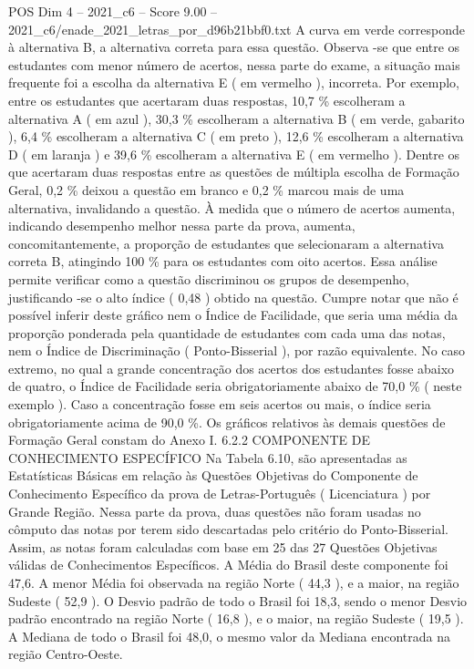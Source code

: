 \begin{textsample}{POS Dim 4 – 2021\_c6 – Score 9.00 – 2021\_c6/enade\_2021\_letras\_por\_d96b21bbf0.txt}
A curva em verde corresponde à alternativa B, a alternativa correta para essa questão.
Observa -se que entre os estudantes com menor número de acertos, nessa parte do exame, a situação mais frequente foi a escolha da alternativa E ( em vermelho ), incorreta.
Por exemplo, entre os estudantes que acertaram duas respostas, 10,7 \% escolheram a alternativa A ( em azul ), 30,3 \% escolheram a alternativa B ( em verde, gabarito ), 6,4 \% escolheram a alternativa C ( em preto ), 12,6 \% escolheram a alternativa D ( em laranja ) e 39,6 \% escolheram a alternativa E ( em vermelho ).
Dentre os que acertaram duas respostas entre as questões de múltipla escolha de Formação Geral, 0,2 \% deixou a questão em branco e 0,2 \% marcou mais de uma alternativa, invalidando a questão.
À medida que o número de acertos aumenta, indicando desempenho melhor nessa parte da prova, aumenta, concomitantemente, a proporção de estudantes que selecionaram a alternativa correta B, atingindo 100 \% para os estudantes com oito acertos.
Essa análise permite verificar como a questão discriminou os grupos de desempenho, justificando -se o alto índice ( 0,48 ) obtido na questão.
Cumpre notar que não é possível inferir deste gráfico nem o Índice de Facilidade, que seria uma média da proporção ponderada pela quantidade de estudantes com cada uma das notas, nem o Índice de Discriminação ( Ponto-Bisserial ), por razão equivalente.
No caso extremo, no qual a grande concentração dos acertos dos estudantes fosse abaixo de quatro, o Índice de Facilidade seria obrigatoriamente abaixo de 70,0 \% ( neste exemplo ).
Caso a concentração fosse em seis acertos ou mais, o índice seria obrigatoriamente acima de 90,0 \%.
Os gráficos relativos às demais questões de Formação Geral constam do Anexo I. 6.2.2 COMPONENTE DE CONHECIMENTO ESPECÍFICO Na Tabela 6.10, são apresentadas as Estatísticas Básicas em relação às Questões Objetivas do Componente de Conhecimento Específico da prova de Letras-Português ( Licenciatura ) por Grande Região.
Nessa parte da prova, duas questões não foram usadas no cômputo das notas por terem sido descartadas pelo critério do Ponto-Bisserial.
Assim, as notas foram calculadas com base em 25 das 27 Questões Objetivas válidas de Conhecimentos Específicos.
A Média do Brasil deste componente foi 47,6.
A menor Média foi observada na região Norte ( 44,3 ), e a maior, na região Sudeste ( 52,9 ).
O Desvio padrão de todo o Brasil foi 18,3, sendo o menor Desvio padrão encontrado na região Norte ( 16,8 ), e o maior, na região Sudeste ( 19,5 ).
A Mediana de todo o Brasil foi 48,0, o mesmo valor da Mediana encontrada na região Centro-Oeste.

\end{textsample}
